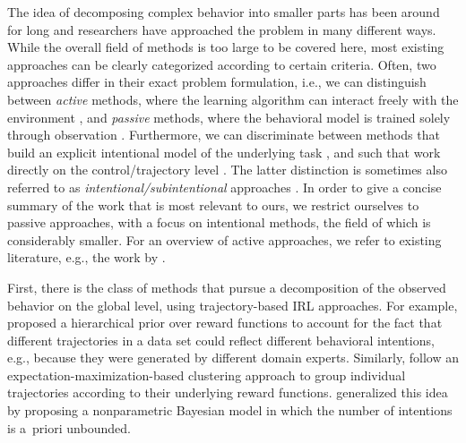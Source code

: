 \documentclass[twoside,11pt]{article}
\newcommand{\ie}{i.e.}
\newcommand{\eg}{e.g.}
\begin{document}
The idea of decomposing complex behavior into smaller %
%
parts has been around for long and researchers have approached the problem
%
%
in many different ways. While the overall field of methods is %
too large to be covered here, most existing approaches can be clearly %
%
categorized according to %
certain criteria. %
Often, two approaches differ in their exact problem formulation, \ie, we can distinguish between \textit{active} methods, where the learning %
algorithm can interact freely with the environment \citep[\eg, hierarchical reinforcement learning,][]{botvinick2012hierarchical,al2015hierarchical}, and \textit{passive} methods, where the behavioral model is trained %
solely through observation \citep[learning from demonstration,][]{argall2009survey}. Furthermore, we can discriminate between methods that build an explicit intentional model of the underlying task \citep[IRL and option-based models,][]{NIPS2012_4737,sutton1999between}, and such that work directly on the control/trajectory level \citep[skill learning, movement primitives,][]{konidaris2012robot,schaal2005learning}. The latter distinction is sometimes also 
referred to
%
as \textit{intentional/subintentional} approaches \citep{albrecht2017autonomous,panella2017interactive}.
%
In order to give a concise summary of the work that is most relevant to ours, we restrict ourselves %
to %
passive approaches, with %
a focus on intentional methods, the field of which is considerably smaller. 
For an overview of %
active approaches, we refer to existing literature, \eg, the work by \citet{daniel2016probabilistic}. 

First, there %
is  the class of
methods that pursue a %
%
decomposition of the observed behavior on the global level, %
using trajectory-based IRL approaches.
For example, \citet{dimitrakakis2011bayesian} proposed a hierarchical prior over reward functions to %
account for the fact that different trajectories in a data set could %
reflect different behavioral intentions, %
\eg, because they %
were generated by different domain experts. Similarly, \citet{babes2011apprenticeship} follow an expectation-maximization-based clustering approach to group individual trajectories according to %
their underlying reward functions. 
\citet{NIPS2012_4737} generalized this %
idea
by proposing a nonparametric Bayesian model in which the number of intentions %
is {a~priori} unbounded.
\end{document}
